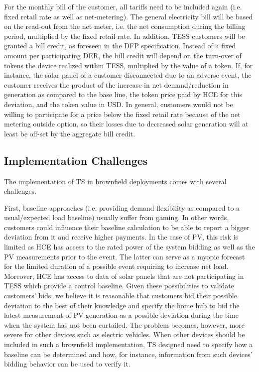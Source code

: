 For the monthly bill of the customer, all tariffs need to be included again (i.e. fixed retail rate as well as net-metering). The general electricity bill will be based on the read-out from the net meter, i.e. the net consumption during the billing period, multiplied by the fixed retail rate. In addition, TESS customers will be granted a bill credit, as foreseen in the DFP specification. Instead of a fixed amount per participating DER, the bill credit will depend on the turn-over of tokens the device realized within TESS, multiplied by the value of a token. If, for instance, the solar panel of a customer disconnected due to an adverse event, the customer receives the product of the increase in net demand/reduction in generation as compared to the base line, the token price paid by HCE for this deviation, and the token value in USD. In general, customers would not be willing to participate for a price below the fixed retail rate because of the net metering outside option, so their losses due to decreased solar generation will at least be off-set by the aggregate bill credit.

\subsection{Implementation Challenges}\label{sec:impl_challenges}

The implementation of TS in brownfield deployments comes with several challenges.

First, baseline approaches (i.e. providing demand flexibility as compared to a usual/expected load baseline) usually suffer from gaming. In other words, customers could influence their baseline calculation to be able to report a bigger deviation from it and receive higher payments. In the case of PV, this risk is limited as HCE has access to the rated power of the system bidding as well as the PV measurements prior to the event. The latter can serve as a myopic forecast for the limited duration of a possible event requiring to increase net load. Moreover, HCE has access to data of solar panels that are not participating in TESS which provide a control baseline. Given these possibilities to validate customers' bids, we believe it is reasonable that customers bid their possible deviation to the best of their knowledge and specify the home hub to bid the latest measurement of PV generation as a possible deviation during the time when the system has not been curtailed. 
The problem becomes, however, more severe for other devices such as electric vehicles. When other devices should be included in such a brownfield implementation, TS designed need to specify how a baseline can be determined and how, for instance, information from such devices' bidding behavior can be used to verify it.

